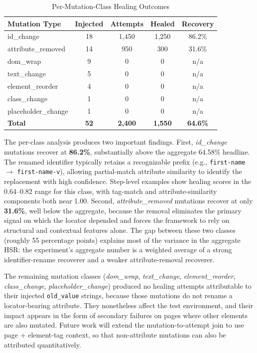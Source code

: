 \documentclass[conference]{IEEEtran}
\begin{document}
\begin{table}[H]
\centering
\caption{Per-Mutation-Class Healing Outcomes}
\label{tab:per_mutation}
\begin{tabular}{lcccc}
\toprule
\textbf{Mutation Type} & \textbf{Injected} & \textbf{Attempts} & \textbf{Healed} & \textbf{Recovery} \\
\midrule
id\_change          & 18 & 1{,}450 & 1{,}250 & 86.2\% \\
attribute\_removed  & 14 &   950   &    300  & 31.6\% \\
dom\_wrap           &  9 &    0    &     0   &   n/a  \\
text\_change        &  5 &    0    &     0   &   n/a  \\
element\_reorder    &  4 &    0    &     0   &   n/a  \\
class\_change       &  1 &    0    &     0   &   n/a  \\
placeholder\_change &  1 &    0    &     0   &   n/a  \\
\midrule
\textbf{Total}      & \textbf{52} & \textbf{2{,}400} & \textbf{1{,}550} & \textbf{64.6\%} \\
\bottomrule
\end{tabular}
\end{table}

The per-class analysis produces two important findings. First, \emph{id\_change} mutations recover at \textbf{86.2\%}, substantially above the aggregate 64.58\% headline. The renamed identifier typically retains a recognizable prefix (e.g., \texttt{first-name} $\rightarrow$ \texttt{first-name-v}), allowing partial-match attribute similarity to identify the replacement with high confidence. Step-level examples show healing scores in the 0.64--0.82 range for this class, with tag-match and attribute-similarity components both near 1.00. Second, \emph{attribute\_removed} mutations recover at only \textbf{31.6\%}, well below the aggregate, because the removal eliminates the primary signal on which the locator depended and forces the framework to rely on structural and contextual features alone. The gap between these two classes (roughly 55 percentage points) explains most of the variance in the aggregate HSR: the experiment's aggregate number is a weighted average of a strong identifier-rename recoverer and a weaker attribute-removal recoverer.

The remaining mutation classes (\emph{dom\_wrap}, \emph{text\_change}, \emph{element\_reorder}, \emph{class\_change}, \emph{placeholder\_change}) produced no healing attempts attributable to their injected \texttt{old\_value} strings, because those mutations do not rename a locator-bearing attribute. They nonetheless affect the test environment, and their impact appears in the form of secondary failures on pages where other elements are also mutated. Future work will extend the mutation-to-attempt join to use page + element-tag context, so that non-attribute mutations can also be attributed quantitatively.
\end{document}
